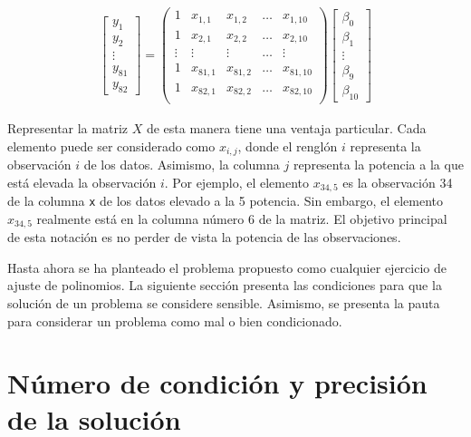 \begin{equation} \label{eq_matrizX}
    \begin{aligned}
    \begin{bmatrix}
    	y_1 \\
    	y_2 \\
    	\vdots \\
    	y_81 \\
    	y_82
    \end{bmatrix}
    =     
    \begin{pmatrix}
    1 & x_{1,1} & x_{1,2} & \dots & x_{1, 10}  \\
    1 & x_{2,1} & x_{2, 2} & \dots & x_{2, 10} \\
    \vdots & \vdots & \vdots & \dots & \vdots \\
    1 & x_{81,1} & x_{81, 2} & \dots & x_{81, 10} \\
    1 & x_{82,1} & x_{82, 2} & \dots & x_{82, 10} \\
    \end{pmatrix}
	\begin{bmatrix}
		\beta_0 \\
		\beta_1 \\
		\vdots \\
		\beta_9 \\
		\beta_10
	\end{bmatrix}
    \end{aligned}
\end{equation} 

Representar la matriz $X$ de esta manera tiene una ventaja particular. Cada elemento puede ser considerado como $x_{i, j}$, donde el renglón $i$ representa la observación $i$ de los datos. Asimismo, la columna $j$ representa la potencia a la que está elevada la observación $i$. Por ejemplo, el elemento $x_{34, 5}$ es la observación 34 de la columna \texttt{x} de los datos elevado a la 5 potencia. Sin embargo, el elemento $x_{34, 5}$ realmente está en la columna número 6 de la matriz. El objetivo principal de esta notación es no perder de vista la potencia de las observaciones. 

Hasta ahora se ha planteado el problema propuesto como cualquier ejercicio de ajuste de polinomios. La siguiente sección presenta las condiciones para que la solución de un problema se considere sensible. Asimismo, se presenta la pauta para considerar un problema como mal o bien condicionado. 

\section{Número de condición y precisión de la solución}

